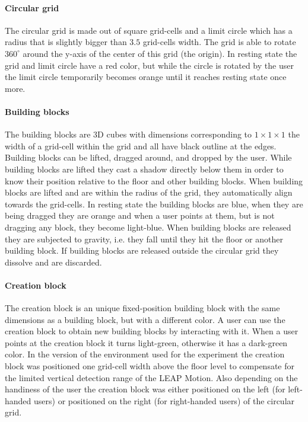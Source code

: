 \paragraph{Circular grid}
The circular grid is made out of square grid-cells and a limit circle which has a radius that is slightly bigger than $3.5$ grid-cells width. The grid is able to rotate $360^{\circ}$ around the y-axis of the center of this grid (the origin). In resting state the grid and limit circle have a red color, but while the circle is rotated by the user the limit circle temporarily becomes orange until it reaches resting state once more. 

\paragraph{Building blocks}
The building blocks are 3D cubes with dimensions corresponding to $1\times 1\times 1$ the width of a grid-cell within the grid and all have black outline at the edges. Building blocks can be lifted, dragged around, and dropped by the user. While building blocks are lifted they cast a shadow directly below them in order to know their position relative to the floor and other building blocks. When building blocks are lifted and are within the radius of the grid, they automatically align towards the grid-cells. In resting state the building blocks are blue, when they are being dragged they are orange and when a user points at them, but is not dragging any block, they become light-blue. When building blocks are released they are subjected to gravity, i.e. they fall until they hit the floor or another building block. If building blocks are released outside the circular grid they dissolve and are discarded.

\paragraph{Creation block}
The creation block is an unique fixed-position building block with the same dimensions as a building block, but with a different color. A user can use the creation block to obtain new building blocks by interacting with it. When a user points at the creation block it turns light-green, otherwise it has a dark-green color. In the version of the environment used for the experiment the creation block was positioned one grid-cell width above the floor level to compensate for the limited vertical detection range of the LEAP Motion. Also depending on the handiness of the user the creation block was either positioned on the left (for left-handed users) or positioned on the right (for right-handed users) of the circular grid.


